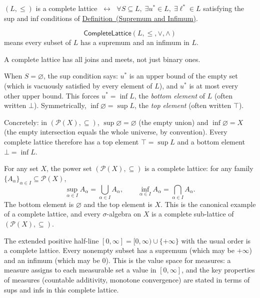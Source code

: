 \begin{remark*}
$(L, \leq)$ is a complete lattice $\;\leftrightarrow\;$
$\forall S \subseteq L,\;\exists u^* \in L,\;\exists \ell^* \in L$ satisfying
the sup and inf conditions of \hyperref[def:sup-inf]{Definition~(Supremum and Infimum)}.
\end{remark*}

\begin{remark*}
\[
  \mathsf{CompleteLattice}(L,\leq,\vee,\wedge)
\] means every subset of $L$ has a
supremum and an infimum in $L$.
\end{remark*}

\begin{remark*}[Interpretation]
A complete lattice has all joins and meets, not just binary ones.
\end{remark*}

\begin{remark*}[Exposition]
When $S = \varnothing$, the sup condition says: $u^*$ is an upper bound of
the empty set (which is vacuously satisfied by every element of $L$), and $u^*$
is at most every other upper bound.  This forces $u^* = \inf L$, the
\emph{bottom element} of $L$ (often written $\bot$).  Symmetrically,
$\inf \varnothing = \sup L$, the \emph{top element} (often written $\top$).

Concretely: in $(\mathcal{P}(X), \subseteq)$, $\sup \varnothing =
\varnothing$ (the empty union) and $\inf \varnothing = X$ (the empty
intersection equals the whole universe, by convention).  Every complete
lattice therefore has a top element $\top = \sup L$ and a bottom element
$\bot = \inf L$.
\end{remark*}

\begin{remark*}[Examples]
For any set $X$, the power set $(\mathcal{P}(X), \subseteq)$ is a complete
lattice: for any family $\{A_\alpha\}_{\alpha \in I} \subseteq \mathcal{P}(X)$,
\[
  \sup_{\alpha \in I} A_\alpha = \bigcup_{\alpha \in I} A_\alpha,
  \qquad
  \inf_{\alpha \in I} A_\alpha = \bigcap_{\alpha \in I} A_\alpha.
\]
The bottom element is $\varnothing$ and the top element is $X$.  This is the
canonical example of a complete lattice, and every $\sigma$-algebra on $X$ is a
complete sub-lattice of $(\mathcal{P}(X), \subseteq)$.
\end{remark*}

\begin{remark*}[Examples]
The extended positive half-line $[0,\infty] = [0,\infty) \cup \{+\infty\}$
with the usual order is a complete lattice.  Every nonempty subset has a
supremum (which may be $+\infty$) and an infimum (which may be $0$).  This
is the value space for measures: a measure assigns to each measurable set
a value in $[0,\infty]$, and the key properties of measures (countable
additivity, monotone convergence) are stated in terms of sups and infs in
this complete lattice.
\end{remark*}

